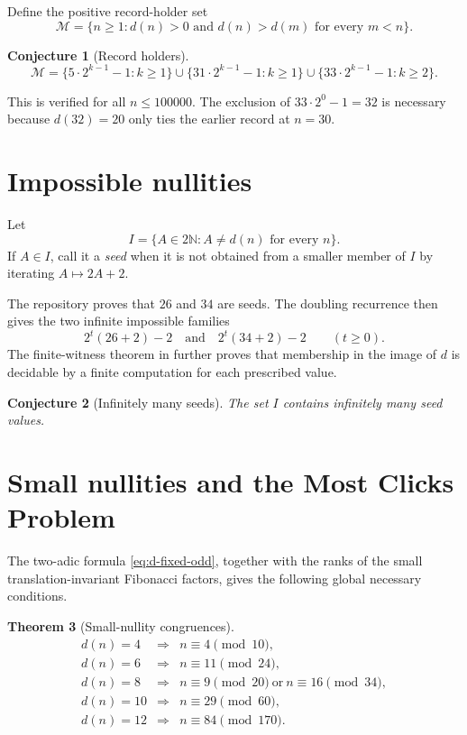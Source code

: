 \documentclass[a4paper]{article}
\newtheorem{theorem}{Theorem}[section]
\newtheorem{conjecture}[theorem]{Conjecture}
\newcommand{\N}{\mathbb{N}}
\begin{document}
Define the positive record-holder set
\[
	\mathcal M=
	\{n\geq1:d(n)>0\text{ and }d(n)>d(m)\text{ for every }m<n\}.
\]

\begin{conjecture}[Record holders]\label{conj:records}
	\[
		\mathcal M=
		\{5\cdot2^{k-1}-1:k\geq1\}
		\cup\{31\cdot2^{k-1}-1:k\geq1\}
		\cup\{33\cdot2^{k-1}-1:k\geq2\}.
	\]
\end{conjecture}

This is verified for all $n\leq100000$.  The exclusion of
$33\cdot2^0-1=32$ is necessary because $d(32)=20$ only ties the earlier
record at $n=30$.

\section{Impossible nullities}

Let
\[
	I=\{A\in2\N:A\neq d(n)\text{ for every }n\}.
\]
If $A\in I$, call it a \emph{seed} when it is not obtained from a smaller
member of $I$ by iterating $A\mapsto2A+2$.

The repository proves that $26$ and $34$ are seeds.  The doubling
recurrence then gives the two infinite impossible families
\[
	2^t(26+2)-2
	\quad\text{and}\quad
	2^t(34+2)-2
	\qquad(t\geq0).
\]
The finite-witness theorem in
 further proves
that membership in the image of $d$ is decidable by a finite computation
for each prescribed value.

\begin{conjecture}[Infinitely many seeds]\label{conj:seeds}
	The set $I$ contains infinitely many seed values.
\end{conjecture}

\section{Small nullities and the Most Clicks Problem}

The two-adic formula \eqref{eq:d-fixed-odd}, together with the ranks of the
small translation-invariant Fibonacci factors, gives the following global
necessary conditions.

\begin{theorem}[Small-nullity congruences]\label{thm:small-nullities}
	\[
	\begin{array}{rcl}
	d(n)=4 &\Longrightarrow& n\equiv4\pmod{10},\\
	d(n)=6 &\Longrightarrow& n\equiv11\pmod{24},\\
	d(n)=8 &\Longrightarrow&
		n\equiv9\pmod{20}\ \text{or}\ n\equiv16\pmod{34},\\
	d(n)=10&\Longrightarrow& n\equiv29\pmod{60},\\
	d(n)=12&\Longrightarrow& n\equiv84\pmod{170}.
	\end{array}
	\]
\end{theorem}
\end{document}

